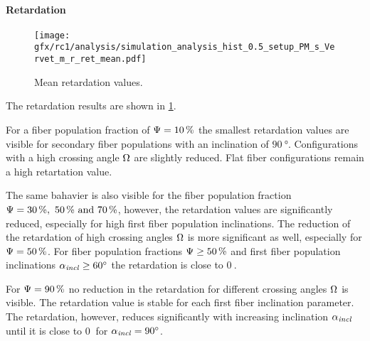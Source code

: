 \paragraph{Retardation}
% 
\begin{figure}[!p]
\centering
\texttt{[image: gfx/rc1/analysis/simulation\_analysis\_hist\_0.5\_setup\_PM\_s\_Vervet\_m\_r\_ret\_mean.pdf]}
\caption{Mean retardation values. }
\label{fig:sim_ana_ret}
\end{figure}
% 
The retardation results are shown in \cref{fig:sim_ana_ret}.

For a fiber population fraction of $\textnormal{$\Psi$}=\SI{10}{\percent}$ the smallest retardation values are visible for secondary fiber populations with an inclination of $\SI{90}{\degree}$.
Configurations with a high crossing angle $\textnormal{$\Omega$}$ are slightly reduced.
Flat fiber configurations remain a high retartation value.
\par
%
The same bahavier is also visible for the fiber population fraction $\modelPsi=\SIlist{30;50;70}{\percent}$, however, the retardation values are significantly reduced, especially for high first fiber population inclinations.
The reduction of the retardation of high crossing angles $\textnormal{$\Omega$}$ is more significant as well, especially for $\textnormal{$\Psi$}=\SI{50}{\percent}$.
For fiber population fractions $\textnormal{$\Psi$} \geq \SI{50}{\percent}$ and first fiber population inclinations $\textnormal{$\alpha_{\mathit{incl}}$} \geq \SI{60}{\degree}$ the retardation is close to $\SI{0}{}$.
\par
%
For $\textnormal{$\Psi$}=\SI{90}{\percent}$ no reduction in the retardation for different crossing angles $\textnormal{$\Omega$}$ is visible.
The retardation value is stable for each first fiber inclination parameter.
The retardation, however, reduces significantly with increasing inclination $\textnormal{$\alpha_{\mathit{incl}}$}$ until it is close to $\SI{0}{}$ for $\textnormal{$\alpha_{\mathit{incl}}$}=\SI{90}{\degree}$.
%
% 
% 
